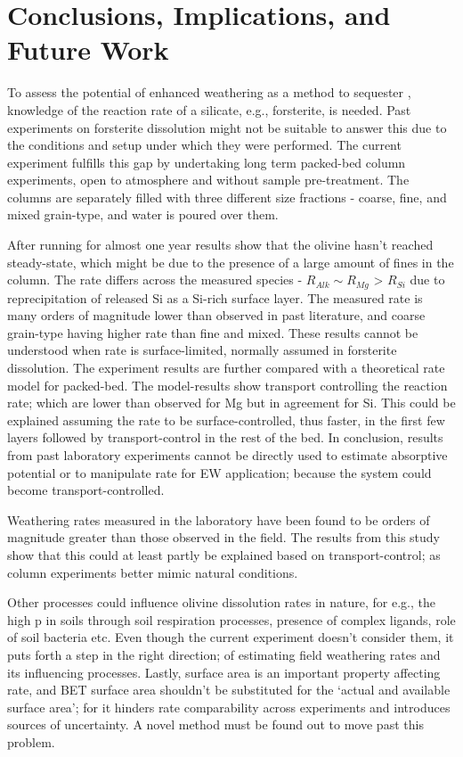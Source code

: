 \chapter{Conclusions, Implications, and Future Work}

To assess the potential of enhanced weathering as a method to sequester , knowledge of the reaction rate of a silicate, e.g., forsterite, is needed. Past experiments on forsterite dissolution might not be suitable to answer this due to the conditions and setup under which they were performed. The current experiment fulfills this gap by undertaking long term packed-bed column experiments, open to atmosphere and without sample pre-treatment. The columns are separately filled with three different size fractions - coarse, fine, and mixed grain-type, and water is poured over them.

After running for almost one year results show that the olivine hasn't reached steady-state, which might be due to the presence of a large amount of fines in the column. The rate differs across the measured species -  $R_{Alk} \sim R_{Mg}$ > $R_{Si}$ due to reprecipitation of released Si as a Si-rich surface layer. The measured rate is many orders of magnitude lower than observed in past literature, and coarse grain-type having higher rate than fine and mixed. These results cannot be understood when rate is surface-limited, normally assumed in forsterite dissolution. The experiment results are further compared with a theoretical rate model for packed-bed. The model-results show transport controlling the reaction rate; which are lower than observed for Mg but in agreement for Si. This could be explained assuming the rate to be surface-controlled, thus faster, in the first few layers followed by transport-control in the rest of the bed. In conclusion, results from past laboratory experiments cannot be directly used to estimate  absorptive potential or to manipulate rate for EW application; because the system could become transport-controlled. 

Weathering rates measured in the laboratory have been found to be orders of magnitude greater than those observed in the field. The results from this study show that this could at least partly be explained based on transport-control; as column experiments better mimic natural conditions.

Other processes could influence olivine dissolution rates in nature, for e.g., the high p in soils through soil respiration processes, presence of complex ligands, role of soil bacteria etc. Even though the current experiment doesn't consider them, it puts forth a step in the right direction; of estimating field weathering rates and its influencing processes. Lastly, surface area is an important property affecting rate, and BET surface area shouldn't be substituted for the `actual and available surface area'; for it hinders rate comparability  across experiments and introduces sources of uncertainty. A novel method must be found out to move past this problem.

